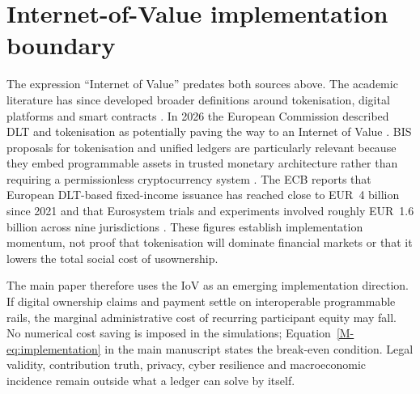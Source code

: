 \section{Internet-of-Value implementation boundary}
The expression ``Internet of Value'' predates both sources above. The academic literature has since developed broader definitions around tokenisation, digital platforms and smart contracts \citep{lohmer2024}. In 2026 the European Commission described DLT and tokenisation as potentially paving the way to an Internet of Value \citep{eciov2026}. BIS proposals for tokenisation and unified ledgers are particularly relevant because they embed programmable assets in trusted monetary architecture rather than requiring a permissionless cryptocurrency system \citep{bis2023,bis2025,bis2026}. The ECB reports that European DLT-based fixed-income issuance has reached close to EUR~4 billion since 2021 and that Eurosystem trials and experiments involved roughly EUR~1.6 billion across nine jurisdictions \citep{cipollone2026}. These figures establish implementation momentum, not proof that tokenisation will dominate financial markets or that it lowers the total social cost of usownership.

The main paper therefore uses the IoV as an emerging implementation direction. If digital ownership claims and payment settle on interoperable programmable rails, the marginal administrative cost of recurring participant equity may fall. No numerical cost saving is imposed in the simulations; Equation~\ref{M-eq:implementation} in the main manuscript states the break-even condition. Legal validity, contribution truth, privacy, cyber resilience and macroeconomic incidence remain outside what a ledger can solve by itself.

